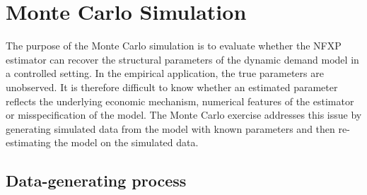 




\newpage
\section{Monte Carlo Simulation}

The purpose of the Monte Carlo simulation is to evaluate whether the NFXP estimator can recover the structural parameters of the dynamic demand model in a controlled setting. In the empirical application, the true parameters are unobserved. It is therefore difficult to know whether an estimated parameter reflects the underlying economic mechanism, numerical features of the estimator or misspecification of the model. The Monte Carlo exercise addresses this issue by generating simulated data from the model with known parameters and then re-estimating the model on the simulated data.

\subsection{Data-generating process}

